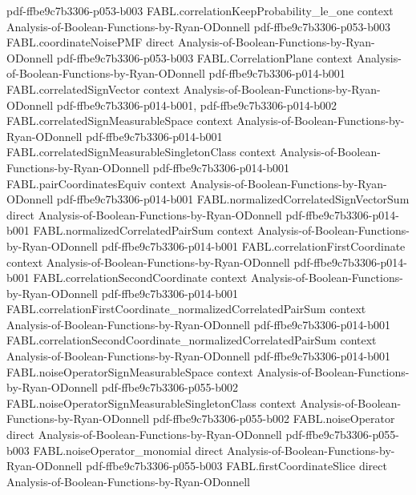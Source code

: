\begin{theorem}
  {pdf-ffbe9c7b3306-p053-b003}
\proofstep
  {FABL.correlationKeepProbability_le_one}
  {context}
  {Analysis-of-Boolean-Functions-by-Ryan-ODonnell}
  {pdf-ffbe9c7b3306-p053-b003}
\proofstep
  {FABL.coordinateNoisePMF}
  {direct}
  {Analysis-of-Boolean-Functions-by-Ryan-ODonnell}
  {pdf-ffbe9c7b3306-p053-b003}
\proofstep
  {FABL.CorrelationPlane}
  {context}
  {Analysis-of-Boolean-Functions-by-Ryan-ODonnell}
  {pdf-ffbe9c7b3306-p014-b001}
\proofstep
  {FABL.correlatedSignVector}
  {context}
  {Analysis-of-Boolean-Functions-by-Ryan-ODonnell}
  {pdf-ffbe9c7b3306-p014-b001,
    pdf-ffbe9c7b3306-p014-b002}
\proofstep
  {FABL.correlatedSignMeasurableSpace}
  {context}
  {Analysis-of-Boolean-Functions-by-Ryan-ODonnell}
  {pdf-ffbe9c7b3306-p014-b001}
\proofstep
  {FABL.correlatedSignMeasurableSingletonClass}
  {context}
  {Analysis-of-Boolean-Functions-by-Ryan-ODonnell}
  {pdf-ffbe9c7b3306-p014-b001}
\proofstep
  {FABL.pairCoordinatesEquiv}
  {context}
  {Analysis-of-Boolean-Functions-by-Ryan-ODonnell}
  {pdf-ffbe9c7b3306-p014-b001}
\proofstep
  {FABL.normalizedCorrelatedSignVectorSum}
  {direct}
  {Analysis-of-Boolean-Functions-by-Ryan-ODonnell}
  {pdf-ffbe9c7b3306-p014-b001}
\proofstep
  {FABL.normalizedCorrelatedPairSum}
  {context}
  {Analysis-of-Boolean-Functions-by-Ryan-ODonnell}
  {pdf-ffbe9c7b3306-p014-b001}
\proofstep
  {FABL.correlationFirstCoordinate}
  {context}
  {Analysis-of-Boolean-Functions-by-Ryan-ODonnell}
  {pdf-ffbe9c7b3306-p014-b001}
\proofstep
  {FABL.correlationSecondCoordinate}
  {context}
  {Analysis-of-Boolean-Functions-by-Ryan-ODonnell}
  {pdf-ffbe9c7b3306-p014-b001}
\proofstep
  {FABL.correlationFirstCoordinate_normalizedCorrelatedPairSum}
  {context}
  {Analysis-of-Boolean-Functions-by-Ryan-ODonnell}
  {pdf-ffbe9c7b3306-p014-b001}
\proofstep
  {FABL.correlationSecondCoordinate_normalizedCorrelatedPairSum}
  {context}
  {Analysis-of-Boolean-Functions-by-Ryan-ODonnell}
  {pdf-ffbe9c7b3306-p014-b001}
\proofstep
  {FABL.noiseOperatorSignMeasurableSpace}
  {context}
  {Analysis-of-Boolean-Functions-by-Ryan-ODonnell}
  {pdf-ffbe9c7b3306-p055-b002}
\proofstep
  {FABL.noiseOperatorSignMeasurableSingletonClass}
  {context}
  {Analysis-of-Boolean-Functions-by-Ryan-ODonnell}
  {pdf-ffbe9c7b3306-p055-b002}
\proofstep
  {FABL.noiseOperator}
  {direct}
  {Analysis-of-Boolean-Functions-by-Ryan-ODonnell}
  {pdf-ffbe9c7b3306-p055-b003}
\proofstep
  {FABL.noiseOperator_monomial}
  {direct}
  {Analysis-of-Boolean-Functions-by-Ryan-ODonnell}
  {pdf-ffbe9c7b3306-p055-b003}
\proofstep
  {FABL.firstCoordinateSlice}
  {direct}
  {Analysis-of-Boolean-Functions-by-Ryan-ODonnell}

\end{theorem}
